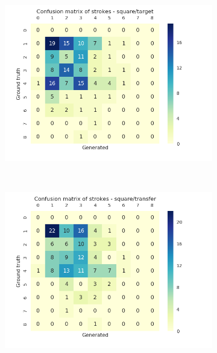 \begin{figure}
        ~
        \begin{subfigure}[tb]{0.45\textwidth}
            \includegraphics[width=\textwidth]{images/sota/quickdraw_results/quickdraw_square_target_strokes_heatmap.png}
        \end{subfigure}
        ~
        \begin{subfigure}[tb]{0.45\textwidth}
            \includegraphics[width=\textwidth]{images/sota/quickdraw_results/quickdraw_square_transfer_strokes_heatmap.png}
        \end{subfigure}

      \end{figure}
